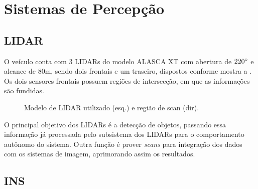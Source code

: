 \section{Sistemas de Percepção}\label{sec:perception}

\subsection{LIDAR}

O veículo conta com 3 LIDARs do modelo ALASCA XT com abertura de $220^{\circ}$ e alcance de 80m, sendo dois frontais e um traseiro, dispostos conforme mostra a . Os dois sensores frontais possuem regiões de intersecção, em que as informações são fundidas.

\begin{figure}[h]
\centering
{}\qquad\qquad
{}
\caption{Modelo de LIDAR utilizado (esq.) e região de scan (dir).}%
\label{fig:lidar}%
\end{figure}

O principal objetivo dos LIDARs é a detecção de objetos, passando essa informação já processada pelo subsistema dos LIDARs para o comportamento autônomo do sistema. Outra função é prover \emph{scans} para integração dos dados com os sistemas de imagem, aprimorando assim os resultados.

\subsection{INS}

